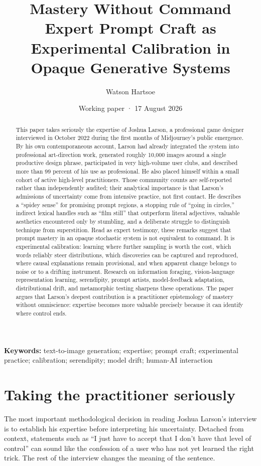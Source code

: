 \documentclass[11pt]{article}
\title{Mastery Without Command\\\large Expert Prompt Craft as Experimental Calibration in Opaque Generative Systems}
\author{Watson Hartsoe}
\date{Working paper · 17 August 2026}
\begin{document}
\maketitle
\thispagestyle{firstpage}
\begin{abstract}
This paper takes seriously the expertise of Joshua Larson, a professional game designer interviewed in October 2022 during the first months of Midjourney's public emergence. By his own contemporaneous account, Larson had already integrated the system into professional art-direction work, generated roughly 10,000 images around a single productive design phrase, participated in very high-volume user clubs, and described more than 99 percent of his use as professional. He also placed himself within a small cohort of active high-level practitioners. Those community counts are self-reported rather than independently audited; their analytical importance is that Larson's admissions of uncertainty come from intensive practice, not first contact. He describes a ``spidey sense'' for promising prompt regions, a stopping rule of ``going in circles,'' indirect lexical handles such as ``film still'' that outperform literal adjectives, valuable aesthetics encountered only by stumbling, and a deliberate struggle to distinguish technique from superstition. Read as expert testimony, these remarks suggest that prompt mastery in an opaque stochastic system is not equivalent to command. It is experimental calibration: learning where further sampling is worth the cost, which words reliably steer distributions, which discoveries can be captured and reproduced, where causal explanations remain provisional, and when apparent change belongs to noise or to a drifting instrument. Research on information foraging, vision-language representation learning, serendipity, prompt artists, model-feedback adaptation, distributional drift, and metamorphic testing sharpens these operations. The paper argues that Larson's deepest contribution is a practitioner epistemology of mastery without omniscience: expertise becomes more valuable precisely because it can identify where control ends.
\end{abstract}
\textbf{Keywords:} text-to-image generation; expertise; prompt craft; experimental practice; calibration; serendipity; model drift; human-AI interaction

\section{Taking the practitioner seriously}
The most important methodological decision in reading Joshua Larson's interview is to establish his expertise before interpreting his uncertainty. Detached from context, statements such as ``I just have to accept that I don't have that level of control'' can sound like the confession of a user who has not yet learned the right trick. The rest of the interview changes the meaning of the sentence.
\end{document}
